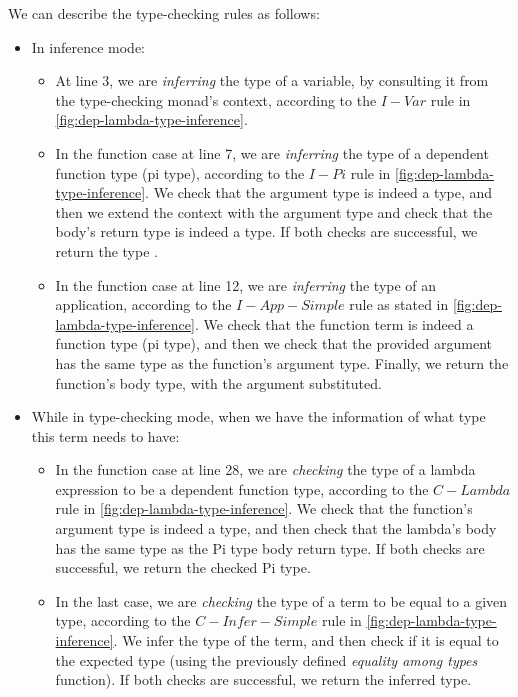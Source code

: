 We can describe the type-checking rules as follows:
\begin{itemize}
       \item In inference mode:
              \begin{itemize}
                     \item At line 3, we are \emph{inferring} the type of a variable, by consulting it from the type-checking monad's context, according to the $I-Var$ rule in \autoref{fig:dep-lambda-type-inference}.
                     \item In the function case at line 7, we are \emph{inferring} the type of a dependent function type (pi type), according to the $I-Pi$ rule in \autoref{fig:dep-lambda-type-inference}. We check that the argument type is indeed a type, and then we extend the context with the argument type and check that the body's return type is indeed a type. If both checks are successful, we return the type .
                     \item In the function case at line 12, we are \emph{inferring} the type of an application, according to the $I-App-Simple$ rule as stated in \autoref{fig:dep-lambda-type-inference}. We check that the function term is indeed a function type (pi type), and then we check that the provided argument has the same type as the function's argument type. Finally, we return the function's body type, with the argument substituted.
              \end{itemize}
       \item While in type-checking mode, when we have the information of what type this term needs to have:
              \begin{itemize}
                     \item In the function case at line 28, we are \emph{checking} the type of a lambda expression to be a dependent function type, according to the $C-Lambda$ rule in \autoref{fig:dep-lambda-type-inference}. We check that the function's argument type is indeed a type, and then check that the lambda's body has the same type as the Pi type body return type. If both checks are successful, we return the checked Pi type.
                     \item In the last case, we are \emph{checking} the type of a term to be equal to a given type, according to the $C-Infer-Simple$ rule in \autoref{fig:dep-lambda-type-inference}. We infer the type of the term, and then check if it is equal to the expected type (using the previously defined \emph{equality among types} function). If both checks are successful, we return the inferred type.
              \end{itemize}
\end{itemize}

